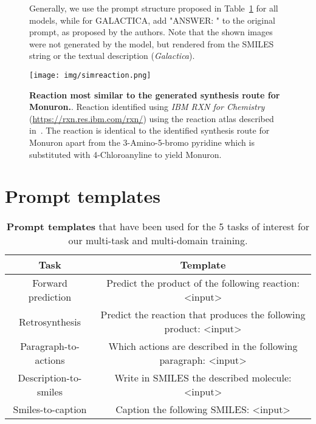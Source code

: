 \documentclass[nohyperref]{article}
\theoremstyle{plain}
\theoremstyle{definition}
\theoremstyle{remark}
\begin{document}
\begin{figure}[ht]
{\newline
Generally, we use the prompt structure proposed in Table~\ref{app:prompts} for all models, while for GALACTICA, add "ANSWER: " to the original prompt, as proposed by the authors. Note that the shown images were not generated by the model, but rendered from the SMILES string or the textual description (\textit{Galactica}).
}
    \label{fig:workflow}
\end{figure}


\begin{figure}[ht]
    \centering
\texttt{[image: img/simreaction.png]}
    \caption{
    \textbf{Reaction most similar to the generated synthesis route for Monuron.}.
    Reaction identified using \textit{IBM RXN for Chemistry} (\url{https://rxn.res.ibm.com/rxn/}) using the reaction atlas described in~\citet{schwaller2021mapping}. The reaction is identical to the identified synthesis route for Monuron apart from the 3-Amino-5-bromo pyridine which is substituted with 4-Chloroanyline to yield Monuron.
    }
\label{fig:simreaction}
\end{figure}



\clearpage

\section{Prompt templates}

\begin{table}[h!]
\centering
\caption{\textbf{Prompt templates} that have been used for the 5 tasks of interest for our multi-task and multi-domain training.}
\begin{tabular}{c|c}
Task                  & Template            \\ 
\toprule
Forward prediction    & Predict the product of the following reaction: \textless{}input\textgreater{}            \\
Retrosynthesis        & Predict the reaction that produces the following product: \textless{}input\textgreater{} \\
Paragraph-to-actions  & Which actions are described in the following paragraph: \textless{}input\textgreater{}   \\
Description-to-smiles & Write in SMILES the described molecule: \textless{}input\textgreater{}                   \\
Smiles-to-caption     & Caption the following SMILES: \textless{}input\textgreater{}
\label{app:prompts}
\end{tabular}
\end{table}
\end{document}
